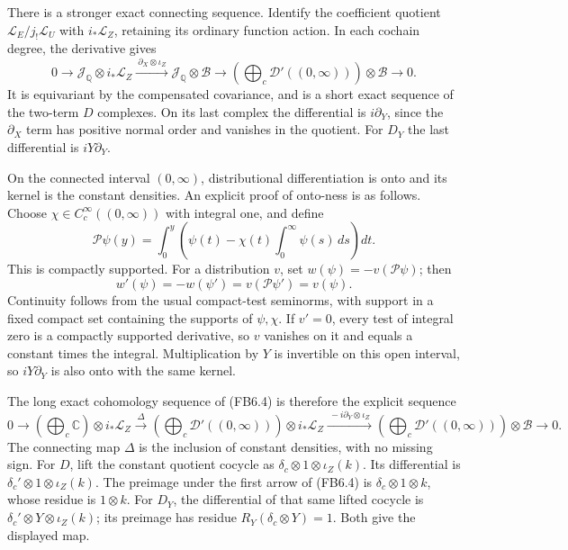 There is a stronger exact connecting sequence. Identify the coefficient
quotient \(\mathscr L_E/j_!\mathscr L_U\) with \(i_*\mathscr L_Z\),
retaining its ordinary function action. In each cochain degree, the
derivative gives \[
0\longrightarrow
\mathcal J_{\mathbb Q}\otimes i_*\mathscr L_Z
\xrightarrow{\ \partial_X\otimes\iota_Z\ }
\mathcal J_{\mathbb Q}\otimes\mathscr B
\longrightarrow
\left(\bigoplus_c\mathcal D'((0,\infty))\right)\otimes\mathscr B
\longrightarrow0.
\tag{FB6.4}
\] It is equivariant by the compensated covariance, and is a short exact
sequence of the two-term \(D\) complexes. On its last complex the
differential is \(i\partial_Y\), since the \(\partial_X\) term has
positive normal order and vanishes in the quotient. For \(D_Y\) the last
differential is \(iY\partial_Y\).

On the connected interval \((0,\infty)\), distributional differentiation
is onto and its kernel is the constant densities. An explicit proof of
onto-ness is as follows. Choose \(\chi\in C_c^\infty((0,\infty))\) with
integral one, and define \[
\mathcal P\psi(y)=\int_0^y
\left(\psi(t)-\chi(t)\int_0^\infty\psi(s)\,ds\right)dt.
\] This is compactly supported. For a distribution \(v\), set
\(w(\psi)=-v(\mathcal P\psi)\); then \[
w'(\psi)=-w(\psi')=v(\mathcal P\psi')=v(\psi).
\] Continuity follows from the usual compact-test seminorms, with
support in a fixed compact set containing the supports of \(\psi,\chi\).
If \(v'=0\), every test of integral zero is a compactly supported
derivative, so \(v\) vanishes on it and equals a constant times the
integral. Multiplication by \(Y\) is invertible on this open interval,
so \(iY\partial_Y\) is also onto with the same kernel.

The long exact cohomology sequence of (FB6.4) is therefore the explicit
sequence \[
0\longrightarrow
\left(\bigoplus_c\mathbb C\right)\otimes i_*\mathscr L_Z
\xrightarrow{\ \Delta\ }
\left(\bigoplus_c\mathcal D'((0,\infty))\right)\otimes i_*\mathscr L_Z
\xrightarrow{\ -i\partial_Y\otimes\iota_Z\ }
\left(\bigoplus_c\mathcal D'((0,\infty))\right)\otimes\mathscr B
\longrightarrow0.
\tag{FB6.5}
\] The connecting map \(\Delta\) is the inclusion of constant densities,
with no missing sign. For \(D\), lift the constant quotient cocycle as
\(\delta_c\otimes1\otimes\iota_Z(k)\). Its differential is
\(\delta_c'\otimes1\otimes\iota_Z(k)\). The preimage under the first
arrow of (FB6.4) is \(\delta_c\otimes1\otimes k\), whose residue is
\(1\otimes k\). For \(D_Y\), the differential of that same lifted
cocycle is \(\delta_c'\otimes Y\otimes\iota_Z(k)\); its preimage has
residue \(R_Y(\delta_c\otimes Y)=1\). Both give the displayed map.


